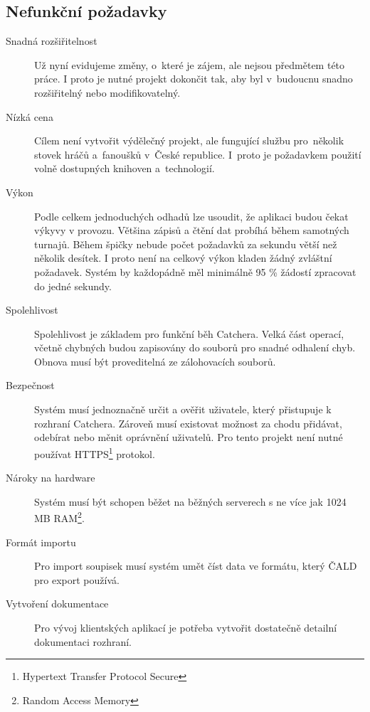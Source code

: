 \subsection{Nefunkční požadavky}

\begin{description}
  \item[Snadná rozšiřitelnost]
    Už nyní evidujeme změny, o~které je zájem, ale nejsou předmětem této práce.
    I proto je nutné projekt dokončit tak, aby byl v~budoucnu snadno rozšiřitelný nebo
    modifikovatelný.
  \item[Nízká cena]
    Cílem není vytvořit výdělečný projekt, ale fungující službu pro~několik stovek hráčů
    a~fanoušků v~České republice. I~proto je požadavkem použití volně dostupných
    knihoven a~technologií.
  \item[Výkon]
    Podle celkem jednoduchých odhadů lze usoudit, že aplikaci budou čekat výkyvy v provozu.
    Většina zápisů a čtění dat probíhá během samotných turnajů. Během špičky nebude počet požadavků za sekundu
    větší než několik desítek. I proto není na celkový výkon kladen žádný zvláštní požadavek.
    Systém by každopádně měl minimálně 95 \% žádostí zpracovat do jedné sekundy.
  \item[Spolehlivost]
    Spolehlivost je základem pro funkční běh Catchera. Velká část operací, včetně chybných budou
    zapisovány do souborů pro snadné odhalení chyb. Obnova musí být proveditelná ze zálohovacích souborů.
    \item[Bezpečnost]
    Systém musí jednoznačně určit a ověřit uživatele, který přistupuje k rozhraní Catchera. Zároveň
    musí existovat možnost za chodu přidávat, odebírat nebo měnit oprávnění uživatelů.
    Pro tento projekt není nutné používat HTTPS\footnote{Hypertext Transfer Protocol Secure} protokol.
  \item[Nároky na hardware]
    Systém musí být schopen běžet na běžných serverech s ne více jak 1024 MB RAM\footnote{Random Access Memory}.
  \item[Formát importu]
    Pro import soupisek musí systém umět číst data ve formátu, který ČALD pro export používá.
  \item[Vytvoření dokumentace]
    Pro vývoj klientských aplikací je potřeba vytvořit dostatečně detailní dokumentaci rozhraní.
\end{description}

